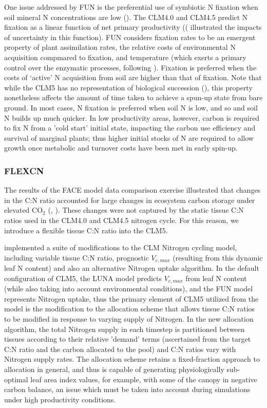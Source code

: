 \documentclass[draft,linenumbers]{agujournal}
\begin{document}
One issue addressed by FUN is the preferential use of symbiotic N fixation when soil mineral N concentrations are low (\cite{vitousek2002}). The CLM4.0 and CLM4.5 predict N fixation as a linear function of net primary productivity ((\cite{wieder2015} illustrated the impacts of uncertainty in this function).  FUN considers fixation rates to be an emergent property of plant assimilation rates, the relative costs of environmental N acquisition compmared to fixation, and temperature (which exerts a primary control over the enzymatic processes, following \cite{houlton2008}). Fixation is preferred when the costs of `active' N acquisition from soil are higher than that of fixation. Note that while the CLM5 has no representation of biological succession (\cite{fisher2018}), this property nonetheless affects the amount of time taken to achieve a spun-up state from bare ground. In most cases, N fixation is preferred when soil N is low, and so and soil N builds up much quicker. In low productivity areas, however, carbon is required to fix N from a 'cold start' initial state, impacting the carbon use efficiency and survival of marginal plants; thus higher initial stocks of N are required to allow growth once metabolic and turnover costs have been met in early spin-up.

\subsubsection{FLEXCN}
The results of the FACE model data comparison exercise illustrated that changes in the C:N ratio accounted for large changes in ecosystem carbon storage under elevated CO$_{2}$ (\cite{zaehle2014}, \cite{medlyn2015using}).  These changes were not captured by the static tissue C:N ratios used in the CLM4.0 and CLM4.5 nitrogen cycle. For this reason, we introduce a flexible tissue C:N ratio into the CLM5.

\cite{ghimire2016} implemented a suite of modifications to the CLM Nitrogen cycling model, including variable tissue C:N ratio, prognostic $V_{c,max}$ (resulting from this dynamic leaf N content) and also an alternative Nitrogen uptake algorithm. In the default configuration of CLM5, the LUNA model predicts $V_{c,max}$ from leaf N content (while also taking into account environmental conditions), and the FUN model represents Nitrogen uptake, thus the primary element of CLM5 utilized from the \cite{ghimire2016} model is the modification to the allocation scheme that allows tissue C:N ratios to be modified in response to varying supply of Nitrogen. In the new allocation algorithm, the total Nitrogen supply in each timestep is partitioned between tissues according to their relative 'demand' terms (ascertained from the target C:N ratio and the carbon allocated to the pool) and C:N ratios vary with Nitrogen supply rates.  The allocation scheme retains a fixed-fraction approach to allocation in general, and thus is capable of generating physiologically sub-optimal leaf area index values, for example, with some of the canopy in negative carbon balance, an issue which must be taken into account during simulations under high productivity conditions. 
\end{document}
